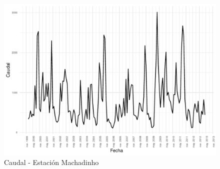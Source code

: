 \documentclass[12pt,oneside]{book}\usepackage[]{graphicx}\usepackage[]{color}
\makeatletter
\def\maxwidth{ %
  \ifdim\Gin@nat@width>\linewidth
    \linewidth
  \else
    \Gin@nat@width
  \fi
}
\newenvironment{knitrout}{}{} %
\theoremstyle{definition} %
\makeatother
\begin{document}
\begin{knitrout}
\color{fgcolor}\begin{figure}[H]

{\centering \includegraphics[width=\maxwidth]{figure/unnamed-chunk-22-1} 

}

\caption{\label{fig:sarimax_serie} Caudal - Estación Machadinho}\label{fig:unnamed-chunk-22}
\end{figure}


\end{knitrout}
\end{document}
